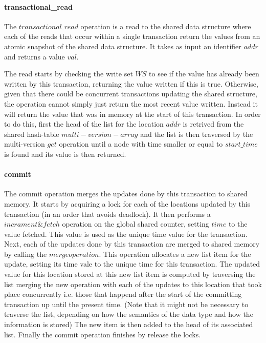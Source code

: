 \documentclass[11pt,letterpaper]{article}
\begin{document}
\paragraph{transactional\_read}
The $\mathit{transactional\_read}$ operation is a read to the shared data structure
where each of the reads that occur within a single transaction return the values from
an atomic snapshot of the shared data structure.
It takes as input an identifier $\mathit{addr}$ and returns a value $\mathit{val}$.

The read starts by checking the write set $\mathit{WS}$ to see if the value has already been written
by this transaction, returning the value written if this is true.
Otherwise, given that there could be concurrent transactions updating the shared structure,
the operation cannot simply just return the most recent value written.
Instead it will return the value that was in memory at the start of this transaction.
In order to do this, first the head of the list for the location $\mathit{addr}$ is retrived
from the shared hash-table $\mathit{multi-version-array}$ and the list is then traversed
by the multi-version $\mathit{get}$ operation
until a node with time smaller or equal to $\mathit{start\_time}$ is found and
its value is then returned.

\paragraph{commit}
The commit operation merges the updates done by this transaction
to shared memory.
It starts by acquiring a lock for each of the locations updated by this transaction
(in an order that avoids deadlock).
It then performs a $\mathit{incrament\&fetch}$ operation on the global shared counter,
setting $\mathit{time}$ to the value fetched.
This value is used as the unique time value for the transaction.
Next, each of the updates done by this transaction are merged to shared memory by
calling the $\mathit{merge operation}$.
This operation allocates a new list item for the update, setting its time vale
to the unique time for this transaction.
The updated value for this location stored at this new list item is computed by traversing the list merging
the new operation with each of the updates to this location that took place concurrently i.e. those that happend
after the start of the committing transaction up until the present time.
(Note that it might not be necessary to traverse the list, depending on how the semantics of the
data type and how the information is stored)
The new item is then added to the head of its associated list.
Finally the commit operation finishes by release the locks.
\end{document}
